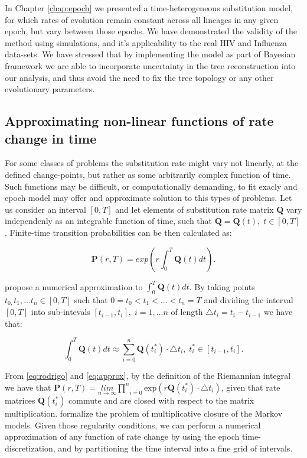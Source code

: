 In Chapter \ref{chap:epoch} we presented a time-heterogeneous substitution model, for which rates of evolution remain constant across all lineages in any given epoch, but vary between those epochs.
We have demonstrated the validity of the method using simulations, and it's applicability to the real HIV and Influenza data-sets.
We have stressed that by implementing the model as part of Bayesian framework we are able to incorporate uncertainty in the tree reconstruction into our analysis, and thus avoid the need to fix the tree topology or any other evolutionary parameters.

\subsection{Approximating non-linear functions of rate change in time\label{sub:nonlinear}}

For some classes of problems the substitution rate might vary not linearly, at the defined change-points, but rather as some arbitrarily complex function of time. 
Such functions may be difficult, or computationally demanding, to fit exacly and epoch model may offer and approximate solution to this types of problems.
Let us consider an interval $\left[0,T\right]$ and let elements of substitution rate matrix $\mathbf{Q}$ vary independenly as an integrable function of time, such that $\mathbf{Q}=\mathbf{Q}(t),\; t\in\left[0,T\right]$. 
Finite-time transition probabilities can be then calculated as: 

\begin{equation}
\ensuremath{\mathbf{P}}(r,T)=exp\left(r\int_{0}^{T}\mathbf{Q}(t)dt\right).\label{eq:rodrigo}
\end{equation}

\noindent
\citet{Rodrigo2008} propose a numerical approximation to $\int_{0}^{T}\mathbf{Q}(t)dt$. 
By taking points $t_{0,}t_{1},\ldots t_{n}\in[0,T]$ such that $0=t_{0}<t_{1}<\ldots<t_{n}=T$ and dividing the interval $\left[0,T\right]$ into sub-intevals $\left[t_{i-1},t_{i}\right],\; i=1,\ldots n$ of length $\triangle t_{i}=t_{i}-t_{i-1}$ we have that:   

\begin{equation}
\int_{0}^{T}\mathbf{Q}(t)dt\approx\underset{i=0}{\overset{n}{\sum}}\mathbf{Q}(t_{i}^{*})\cdot\triangle t_{i},\; t_{i}^{*}\in[t_{i-1},t_{i}].\label{eq:approx}
\end{equation}

\noindent
From \ref{eq:rodrigo} and \ref{eq:approx}, by the definition of the Riemannian integral we have that $\mathbf{P}(r,T)=\underset{n\rightarrow\infty}{lim}\underset{i=0}{\overset{n}{\prod}}\text{exp}\left(r\mathbf{Q}(t_{i}^{*})\cdot\triangle t_{i}\right)$, given that rate matrices $\mathbf{Q}(t_{i}^{*})$ commute 
and are closed with respect to the matrix multiplication.
\citet{Sumner2012} formalize the problem of multiplicative closure of the Markov models. 
Given those regularity conditions, we can perform a numerical approximation of any function of rate change by using the epoch time-discretization, and by partitioning the time interval into a fine grid of intervals. 

